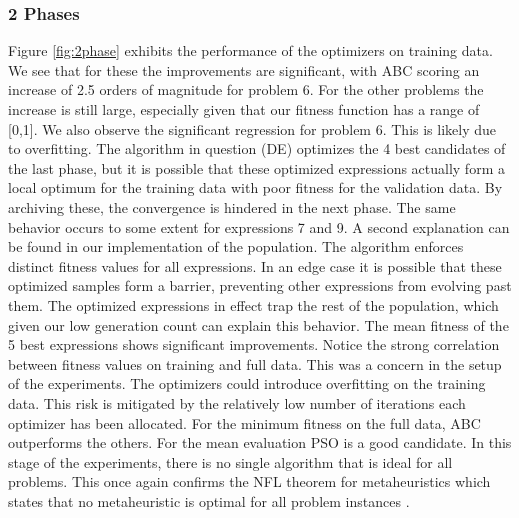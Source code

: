 \subsubsection{2 Phases}
Figure \ref{fig:2phase} exhibits the performance of the optimizers on training data. 
We see that for these the improvements are significant, with ABC scoring an increase of 2.5 orders of magnitude for problem 6. For the other problems the increase is still large, especially given that our fitness function has a range of [0,1].
We also observe the significant regression for problem 6. This is likely due to overfitting. The algorithm in question (DE) optimizes the 4 best candidates of the last phase, but it is possible that these optimized expressions actually form a local optimum for the training data with poor fitness for the validation data. By archiving these, the convergence is hindered in the next phase. The same behavior occurs to some extent for expressions 7 and 9. A second explanation can be found in our implementation of the population. The algorithm enforces distinct fitness values for all expressions. In an edge case it is possible that these optimized samples form a barrier, preventing other expressions from evolving past them. The optimized expressions in effect trap the rest of the population, which given our low generation count can explain this behavior. The mean fitness of the 5 best expressions shows significant improvements. Notice the strong correlation between fitness values on training and full data. This was a concern in the setup of the experiments. The optimizers could introduce overfitting on the training data. This risk is mitigated by the relatively low number of iterations each optimizer has been allocated. For the minimum fitness on the full data, ABC outperforms the others. For the mean evaluation PSO is a good candidate. In this stage of the experiments, there is no single algorithm that is ideal for all problems. This once again confirms the NFL theorem for metaheuristics which states that no metaheuristic is optimal for all problem instances \cite{NFL}.
